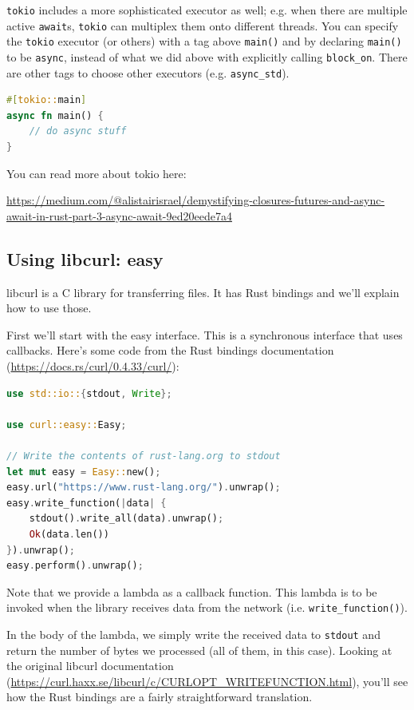 \documentclass[a4paper]{report}
\begin{document}
\texttt{tokio} includes a more sophisticated executor as well; e.g. when
there are multiple active \texttt{await}s, \texttt{tokio} can multiplex them onto
different threads. You can specify the \texttt{tokio} executor (or others) with a
tag above {\tt main()} and by declaring \texttt{main()} to be \texttt{async},
instead of what we did above with explicitly calling \texttt{block\_on}.
There are other tags to choose other executors (e.g. \texttt{async\_std}).
\begin{lstlisting}[language=Rust]
#[tokio::main]
async fn main() {
    // do async stuff
}
\end{lstlisting}
You can read more about tokio here:
\begin{center}
\url{https://medium.com/@alistairisrael/demystifying-closures-futures-and-async-await-in-rust-part-3-async-await-9ed20eede7a4}
\end{center}

\subsection*{Using libcurl: easy}
libcurl is a C library for transferring files. It has Rust bindings and we'll
explain how to use those.

First we'll start with the easy interface. This is a synchronous interface
that uses callbacks. Here's some code from the Rust bindings documentation
(\url{https://docs.rs/curl/0.4.33/curl/}):

\begin{lstlisting}[language=Rust]
use std::io::{stdout, Write};

use curl::easy::Easy;

// Write the contents of rust-lang.org to stdout
let mut easy = Easy::new();
easy.url("https://www.rust-lang.org/").unwrap();
easy.write_function(|data| {
    stdout().write_all(data).unwrap();
    Ok(data.len())
}).unwrap();
easy.perform().unwrap();
\end{lstlisting}
Note that we provide a lambda as a callback function. This lambda is to be invoked
when the library receives data from the network (i.e. \texttt{write\_function()}).

In the body of the lambda, we simply write the received data to \texttt{stdout}
and return the number of bytes we processed (all of them, in this case).
Looking at the original libcurl documentation (\url{https://curl.haxx.se/libcurl/c/CURLOPT_WRITEFUNCTION.html}), you'll see how the Rust bindings
are a fairly straightforward translation.
\end{document}
